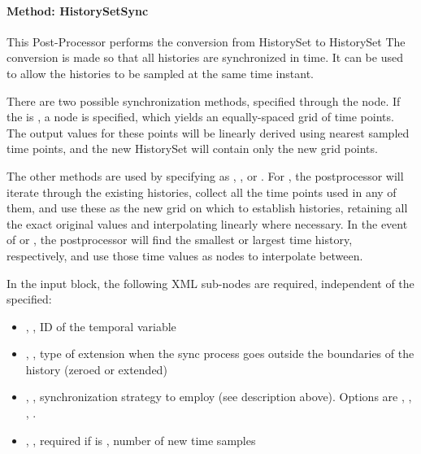 \paragraph{Method: HistorySetSync}
This Post-Processor performs the conversion from HistorySet to HistorySet
The conversion is made so that all histories are synchronized in time.
It can be used to allow the histories to be sampled at the same time instant.

There are two possible synchronization methods, specified through the  node.  If the
 is , a  node is specified,
which yields an equally-spaced grid of time points. The output values for these points will be linearly derived
using nearest sampled time points, and the new HistorySet will contain only the new grid points.

The other methods are used by specifying  as , , or
.  For , the postprocessor will iterate through the
existing histories, collect all the time points used in any of them, and use these as the new grid on which to
establish histories, retaining all the exact original values and interpolating linearly where necessary.
In the event of  or , the postprocessor will find the smallest or largest time
history, respectively, and use those time values as nodes to interpolate between.

In the  input block, the following XML sub-nodes are required,
independent of the  specified:

\begin{itemize}
   \item {}, , ID of the temporal variable
   \item {}, , type of extension when the sync process goes outside the boundaries of the history (zeroed or extended)
   \item {}, , synchronization strategy to employ (see
     description above).  Options are , , , .
   \item {}, , required if  is
     , number of new time samples
\end{itemize}

